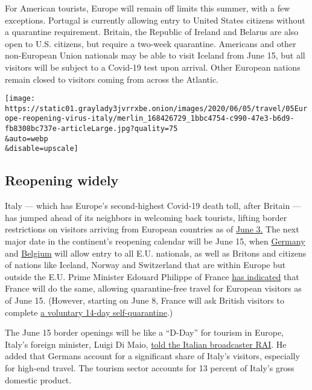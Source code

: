 For American tourists, Europe will remain off limits this summer, with a
few exceptions. Portugal is currently allowing entry to United States
citizens without a quarantine requirement. Britain, the Republic of
Ireland and Belarus are also open to U.S. citizens, but require a
two-week quarantine. Americans and other non-European Union nationals
may be able to visit Iceland from June 15, but all visitors will be
subject to a Covid-19 test upon arrival. Other European nations remain
closed to visitors coming from across the Atlantic.

\texttt{[image: https://static01.graylady3jvrrxbe.onion/images/2020/06/05/travel/05Europe-reopening-virus-italy/merlin\_168426729\_1bbc4754-c990-47e3-b6d9-fb8308bc737e-articleLarge.jpg?quality=75\\\&auto=webp\\\&disable=upscale]}

\hypertarget{reopening-widely}{%
\subsection{Reopening widely}\label{reopening-widely}}

Italy --- which has Europe's second-highest Covid-19 death toll, after
Britain --- has jumped ahead of its neighbors in welcoming back
tourists, lifting border restrictions on visitors arriving from European
countries as of
\href{https://www.thelocal.it/20200518/who-is-allowed-to-travel-to-italy-from-june-3rd}{June
3.} The next major date in the continent's reopening calendar will be
June 15, when
\href{https://www.schengenvisainfo.com/news/germany-plans-to-open-borders-for-eea-citizens-from-june-15/}{Germany}
and \href{https://www.belgium.be/en/corona}{Belgium} will allow entry to
all E.U. nationals, as well as Britons and citizens of nations like
Iceland, Norway and Switzerland that are within Europe but outside the
E.U. Prime Minister Edouard Philippe of France
\href{https://twitter.com/EPhilippePM/status/1266035805262405632}{has
indicated} that France will do the same, allowing quarantine-free travel
for European visitors as of June 15. (However, starting on June 8,
France will ask British visitors to complete
\href{https://www.gov.uk/government/news/french-border-restrictions-in-response-to-coronavirus}{a
voluntary 14-day self-quarantine}.)

The June 15 border openings will be like a ``D-Day'' for tourism in
Europe, Italy's foreign minister, Luigi Di Maio,
\href{https://www.youtube.com/watch?v=10o8VmIoN78}{told the Italian
broadcaster RAI}. He added that Germans account for a significant share
of Italy's visitors, especially for high-end travel. The tourism sector
accounts for 13 percent of Italy's gross domestic product.

